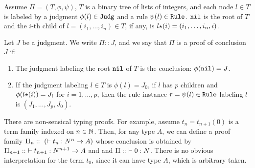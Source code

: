 
\begin{definition}
Assume $\Pi=(T,\phi, \psi)$, $T$ is a binary tree of lists of integers, and each node $l \in T$
is labeled by a judgment $\phi(l) \in {\tt Judg}$ and a rule $\psi(l) \in {\tt Rule}$. 
${\tt nil}$ is the root of $T$ and the $i$-th child of $l = ( i_1, \ldots, i_n ) \in T$, if any, 
is $l {\star} (i) = ( i_1, \ldots, i_n, i)$.

Let $J$ be a judgment. 
We write $\Pi :: J$, and we say that $\Pi$ is a proof of conclusion $J$ if:
\begin{enumerate}
\item 
  The judgment labeling the root ${\tt nil}$ of $T$ is the conclusion: $\phi({\tt nil}) = J$.
\item
  If the judgment labeling $l \in T$ is $\phi(l) = J_0$, if $l$ has $p$ children
  and $\phi(l {\star} (i)) = J_i$ for $i=1, \ldots, p$,
  then the rule instance $r = \psi(l) \in {\tt Rule}$ labeling $l$ is $(J_1,\ldots,J_p,J_0)$.
\end{enumerate}
\end{definition}

%
%

There are non-sensical typing proofs. For example, assume $t_n = t_{n+1}(0)$ is
a term family indexed on $n \in \mathbb{N}$. Then, for any type $A$, we can define a proof family
$\Pi_n ::\ (\vdash t_n : \N^n \rightarrow A)$ whose conclusion is obtained by
$\Pi_{n+1} ::\ \vdash t_{n+1} : {N}^{n+1} \rightarrow A$ and
and $\Pi ::\ \vdash 0:{N}$. 
There is no obvious interpretation for the term $t_0$, 
since it can have type $A$, which is arbitrary taken. 

